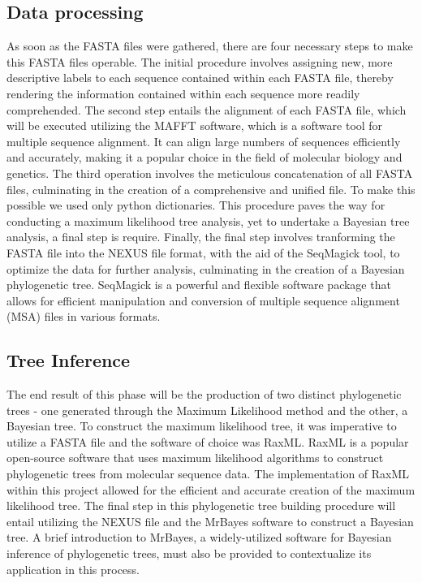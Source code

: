 \documentclass[12pt]{article}
\begin{document}
\subsection{Data processing}
As soon as the FASTA files were gathered, there are four necessary steps to make this FASTA files operable.\newline
The initial procedure involves assigning new, more descriptive labels to each sequence contained within each FASTA file, thereby rendering the information contained within each sequence more readily comprehended.\newline
The second step entails the alignment of each FASTA file, which will be executed utilizing the MAFFT software, which is a software tool for multiple sequence alignment. It can align large numbers of sequences efficiently and accurately, making it a popular choice in the field of molecular biology and genetics.\newline
The third operation involves the meticulous concatenation of all FASTA files, culminating in the creation of a comprehensive and unified file. To make this possible we used only python dictionaries. This procedure paves the way for conducting a maximum likelihood tree analysis, yet to undertake a Bayesian tree analysis, a final step is require.\newline
Finally, the final step involves tranforming the FASTA file into the NEXUS file format, with the aid of the SeqMagick tool, to optimize the data for further analysis, culminating in the creation of a Bayesian phylogenetic tree. SeqMagick is a powerful and flexible software package that allows for efficient manipulation and conversion of multiple sequence alignment (MSA) files in various formats.
\subsection{Tree Inference}
The end result of this phase will be the production of two distinct phylogenetic trees - one generated through the Maximum Likelihood method and the other, a Bayesian tree.\newline
To construct the maximum likelihood tree, it was imperative to utilize a FASTA file and the software of choice was RaxML. RaxML is a popular open-source software that uses maximum likelihood algorithms to construct phylogenetic trees from molecular sequence data. The implementation of RaxML within this project allowed for the efficient and accurate creation of the maximum likelihood tree.\newline
The final step in this phylogenetic tree building procedure will entail utilizing the NEXUS file and the MrBayes software to construct a Bayesian tree. A brief introduction to MrBayes, a widely-utilized software for Bayesian inference of phylogenetic trees, must also be provided to contextualize its application in this process.
\end{document}
